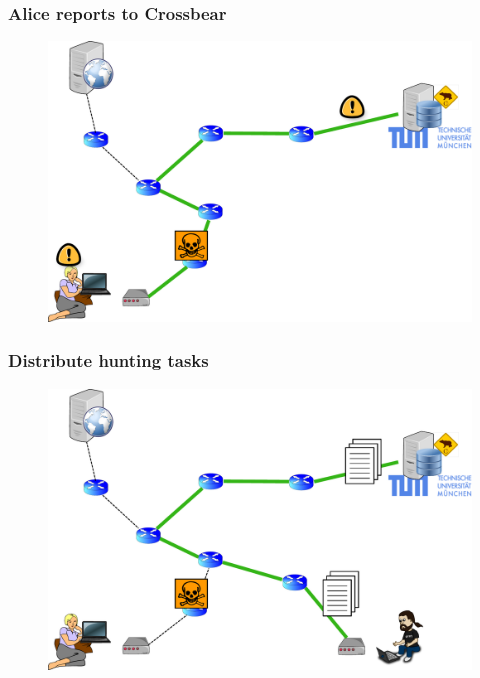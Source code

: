 \begin{frame}
\frametitle{Alice reports to Crossbear}
  \begin{block}{}
    \vskip -1.2cm
    \begin{figure}[t]
    \centering
     \includegraphics[scale=.36]{figures/reporting-7-huntingreport}
    \end{figure}
  \end{block}
\end{frame}

\begin{frame}
\frametitle{Distribute hunting tasks}
  \begin{block}{}
    \vskip -1.2cm
    \begin{figure}[t]
    \centering
     \includegraphics[scale=.36]{figures/hunting-1-polling}
    \end{figure}
  \end{block}
\end{frame}

